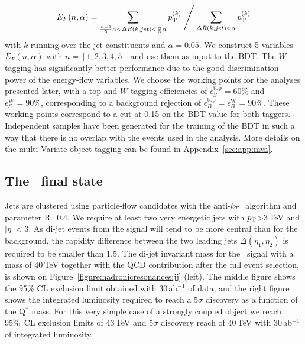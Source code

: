 \begin{equation}
E_{F}(n,\alpha) =  \sum \limits_{\frac{n-1}{5}\alpha < \Delta R(k,jet)< \frac{n}{5}\alpha} p_{\text{T}}^{(k)} \Biggm/ \sum \limits_{\Delta R(k,jet)< \alpha} p_{\text{T}}^{(k)}
\end{equation}
with $k$ running over the jet constituents and $\alpha=0.05$. We construct 5 variables $E_{F}(n,\alpha)$ with $n=[1,2,3,4,5]$ and use them as input to the BDT.
The $W$ tagging has significantly better performance due to the good discrimination power of the energy-flow variables. We choose the working points for the analyses presented later, with a top and $W$ tagging efficiencies of $\epsilon_S^{\text{top}}=60\%$ and $\epsilon_S^{\text{W}}=90\%$, corresponding to a background rejection of $\epsilon_B^{\text{top}}=\epsilon_B^{\text{W}}=90\%$. These working points correspond to a cut at 0.15 on the BDT value for both taggers. Independent samples have been generated for the training of the BDT in such a way that there is no overlap with the events used in the analysis.  More details on the multi-Variate object tagging can be found in Appendix~\ref{sec:app:mva}.

\subsection{The \jj\ final state}
\label{sec:hadjj}

Jets are clustered using particle-flow candidates with the anti-$k_T$~\cite{Cacciari:2008gp} algorithm and  parameter R=0.4. We require at least two very energetic jets with $p_{\text{T}}$>3\,TeV and $|\eta|<3$. As di-jet events from the signal will tend to be more central than for the background, the rapidity difference between the two leading jets $\Delta(\eta_1, \eta_2)$ is required to be smaller than 1.5. The di-jet invariant mass for the \qjj\ signal with a mass of 40\,TeV together with the QCD contribution after the full event selection, is shown on Figure~\ref{figure:hadronicresonances:jj} (left). The middle figure shows the 95\% CL exclusion limit obtained with 30\,ab$^{-1}$ of data, and the right figure shows the integrated luminosity required to reach a $5\sigma$ discovery as a function of the Q$^*$ mass. For this very simple case of a strongly coupled object we reach 95\%~CL exclusion limits of 43\,TeV and 5$\sigma$ discovery reach of 40\,TeV with 30\,ab$^{-1}$ of integrated luminosity. 


